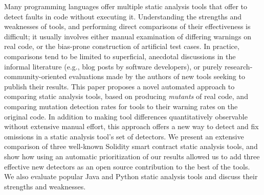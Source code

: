 Many programming languages offer multiple static analysis tools that offer to detect faults in code without executing it.  Understanding the strengths and weaknesses of tools, and performing direct comparisons of their effectiveness is difficult; it usually involves either manual examination of differing warnings on real code, or the bias-prone construction of artificial test cases.  In practice, comparisons tend to be limited to superficial, anecdotal discussions in the informal literature (e.g., blog posts by software developers), or purely research-community-oriented evaluations made by the authors of new tools seeking to publish their results.  This paper proposes a novel automated approach to comparing static analysis tools, based on producing \emph{mutants} of real code, and comparing mutation detection rates for tools to their warning rates on the original code.  In addition to making tool differences quantitatively observable without extensive manual effort, this approach offers a new way to detect and fix omissions in a static analysis tool's set of detectors.  We present an extensive comparison of three well-known Solidity smart contract static analysis tools, and show how using an automatic prioritization of our results allowed us to add three effective new detectors as an open source contribution to the best of the tools.  We also evaluate popular Java and Python static analysis tools and discuss their strengths and weaknesses.